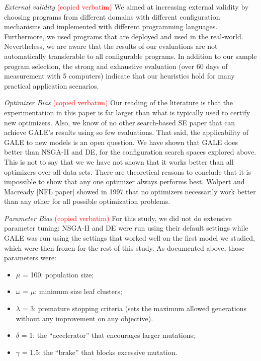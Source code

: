 \documentclass{sig-alternative}
\begin{document}
{\em External validity} \textcolor{red}{(copied verbatim)} We aimed at increasing external validity by choosing programs from different domains with different configuration mechanisms and implemented with different programming languages. Furthermore, we used programs that are deployed and used in the real-world. Nevertheless, we are aware that the results of our evaluations are not automatically transferable to all configurable programs. In addition to our sample program selection, the strong and exhaustive evaluation (over 60 days of measurement with 5 computers) indicate that our heuristics hold for many practical application scenarios.

{\em Optimizer Bias} \textcolor{red}{(copied verbatim)}
Our reading of the literature is that the experimentation
in this paper is far larger than what is typically used
to certify new optimizers. Also, we know of no other
search-based SE paper that can achieve GALE’s results
using so few evaluations.
That said, the applicability of GALE to new models
is an open question. We have shown that GALE does
better than NSGA-II and DE, for the configuration search spaces explored
above. This is not to say that we we have not shown that
it works better than all optimizers over all data sets.
There are theoretical reasons to conclude that it is impossible
to show that any one optimizer always performs
best. Wolpert and Macready [NFL paper] showed in 1997 that no
optimizers necessarily work better than any other for all possible optimization problems.

{\em Parameter Bias} \textcolor{red}{(copied verbatim)}
For this study, we did not do extensive parameter tuning:
NSGA-II and DE were run using their default
settings while GALE was run using the settings that
worked well on the first model we studied, which were
then frozen for the rest of this study. As documented
above, those parameters were:
\begin{itemize}
\item $\mu$ = 100: population size;
\item $\omega$ = $\mu$: minimum size leaf clusters;
\item $\lambda$ = 3: premature stopping criteria (sets the maximum
allowed generations without any improvement
on any objective).
\item $\delta$ = 1: the ``accelerator'' that encourages larger
mutations;
\item $\gamma$ = 1.5: the ``brake'' that blocks excessive mutation.
\end{itemize}
\end{document}
